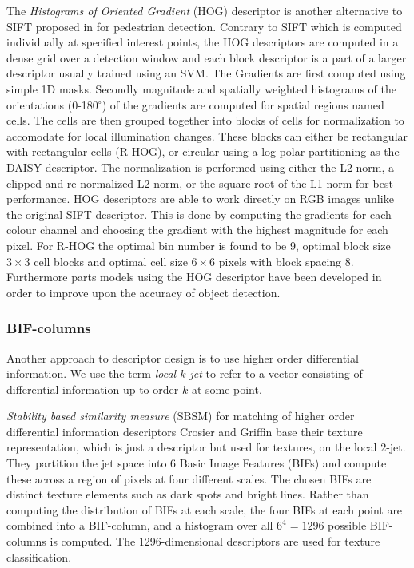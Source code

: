 \documentclass[../thesis.tex]{subfiles}
\begin{document}
The \emph{Histograms of Oriented Gradient} (HOG) descriptor is another
alternative to SIFT proposed in \cite{dalal2005histograms} for pedestrian
detection. Contrary to SIFT which is computed individually at specified
interest points, the HOG descriptors are computed in a dense grid over a
detection window and each block descriptor is a part of a larger descriptor
usually trained using an SVM. The Gradients are first computed using simple
1D masks. Secondly magnitude and spatially weighted histograms of the
orientations (0-180$^{\circ}$) of the gradients are computed for spatial
regions named cells. The cells are
then grouped together into blocks of cells for normalization to accomodate
for local illumination changes. These blocks can either be rectangular with
rectangular cells (R-HOG), or circular using a log-polar partitioning as the
DAISY descriptor. The normalization is performed using either the L2-norm,
a clipped and re-normalized L2-norm, or the square root of the L1-norm for
best performance. HOG descriptors are able to work directly on RGB images
unlike the original SIFT descriptor. This is done by computing the gradients
for each colour channel and choosing the gradient with the highest magnitude
for each pixel. For R-HOG the optimal bin number is found to be 9, optimal
block size $3\times3$ cell blocks and optimal cell size $6\times6$ pixels
with block spacing 8.
Furthermore parts models using the HOG descriptor have been developed
\cite{felzenszwalb2008discriminatively} in order to improve upon the accuracy
of object detection.

\subsubsection{BIF-columns}

Another approach to descriptor design is to use higher order differential
information.
We use the term \emph{local $k$-jet} to refer to a vector
consisting of differential information up to order $k$ at some point.

\emph{Stability based similarity measure} (SBSM) \cite{balmashnova2008novel} for
matching of higher order differential information descriptors
Crosier and Griffin \cite{crosier2010using} base their texture representation, which
is just a descriptor but used for textures, on the local $2$-jet. They
partition the jet space into 6 Basic Image Features (BIFs) and compute these
across a region of pixels at four different scales. The chosen BIFs are
distinct texture elements such as dark spots and bright lines. Rather than
computing the distribution of BIFs at each scale, the four BIFs at each point
are combined into a BIF-column, and a histogram over all $6^4 = 1296$ possible
BIF-columns is computed. The 1296-dimensional descriptors are used for texture
classification.
\end{document}
